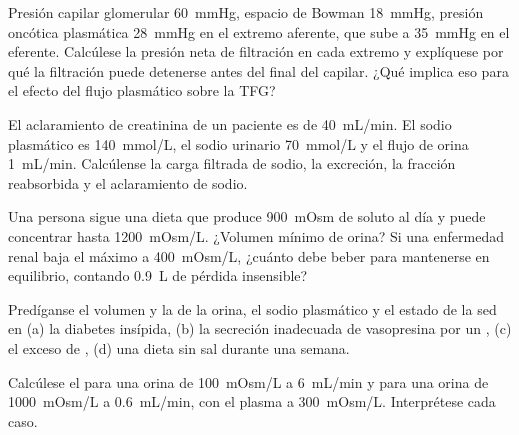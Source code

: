\begin{exercise}[$\star\star$]\label{exo:b3:renal-osmoregulation:5}
Presión capilar glomerular \qty{60}{mmHg}, espacio de Bowman
\qty{18}{mmHg}, presión oncótica plasmática \qty{28}{mmHg} en el
extremo aferente, que sube a \qty{35}{mmHg} en el eferente. Calcúlese
la presión neta de filtración en cada extremo y explíquese por qué la
filtración puede detenerse antes del final del capilar. ¿Qué implica
eso para el efecto del flujo plasmático sobre la TFG?
\end{exercise}

\begin{exercise}[$\star\star$]\label{exo:b3:renal-osmoregulation:6}
El aclaramiento de creatinina de un paciente es de \qty{40}{mL/min}. El
sodio plasmático es \qty{140}{mmol/L}, el sodio urinario
\qty{70}{mmol/L} y el flujo de orina \qty{1}{mL/min}. Calcúlense la
carga filtrada de sodio, la excreción, la fracción reabsorbida y el
aclaramiento de sodio.
\end{exercise}

\begin{exercise}[$\star\star$]\label{exo:b3:renal-osmoregulation:7}
Una persona sigue una dieta que produce \qty{900}{mOsm} de soluto al
día y puede concentrar hasta \qty{1200}{mOsm/L}. ¿Volumen mínimo de
orina? Si una enfermedad renal baja el máximo a \qty{400}{mOsm/L},
¿cuánto debe beber para mantenerse en equilibrio, contando
\qty{0.9}{L} de pérdida insensible?
\end{exercise}

\begin{exercise}[$\star\star$]\label{exo:b3:renal-osmoregulation:8}
Predíganse el volumen y la  de la orina, el sodio plasmático
y el estado de la sed en (a) la diabetes insípida, (b) la secreción
inadecuada de vasopresina por un , (c) el exceso de ,
(d) una dieta sin sal durante una semana.
\end{exercise}

\begin{exercise}[$\star\star$]\label{exo:b3:renal-osmoregulation:9}
Calcúlese el  para una orina de
\qty{100}{mOsm/L} a \qty{6}{mL/min} y para una orina de
\qty{1000}{mOsm/L} a \qty{0.6}{mL/min}, con el plasma a
\qty{300}{mOsm/L}. Interprétese cada caso.
\end{exercise}

